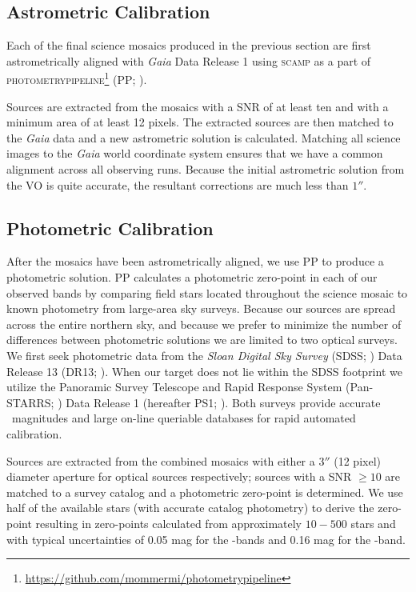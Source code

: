 \documentclass[apj, revtex4-1]{emulateapj}
\begin{document}

\subsection{Astrometric Calibration}
Each of the final science mosaics produced in the previous section are first astrometrically aligned with \textit{Gaia} \citep{GaiaCollaboration2016} Data Release 1 \citep{GaiaCollaboration2016a} using \textsc{scamp} \citep{Bertin2006} as a part of \textsc{photometrypipeline}\footnote{\url{https://github.com/mommermi/photometrypipeline}} (PP; \citealt{Mommert2017}).

Sources are extracted from the mosaics with a SNR of at least ten and with a minimum area of at least 12 pixels. The extracted sources are then matched to the \textit{Gaia} data and a new astrometric solution is calculated. Matching all science images to the \textit{Gaia} world coordinate system ensures that we have a common alignment across all observing runs. Because the initial astrometric solution from the VO is quite accurate, the resultant corrections are much less than $1''$.

\subsection{Photometric Calibration}
After the mosaics have been astrometrically aligned, we use PP to produce a photometric solution. PP calculates a photometric zero-point in each of our observed bands by comparing field stars located throughout the science mosaic to known photometry from large-area sky surveys. Because our sources are spread across the entire northern sky, and because we prefer to minimize the number of differences between photometric solutions we are limited to two optical surveys. We first seek photometric data from the \textit{Sloan Digital Sky Survey} (SDSS; \citealt{York2000}) Data Release 13 (DR13; \citealt{Albareti2017}). When our target does not lie within the SDSS footprint we utilize the Panoramic Survey Telescope and Rapid Response System (Pan-STARRS; \citealt{Chambers2016}) Data Release 1 (hereafter PS1; \citealt{Flewelling2016}). Both surveys provide accurate \sdssg\sdssr\sdssi\sdssz\ magnitudes and large on-line queriable databases for rapid automated calibration.

Sources are extracted from the combined mosaics with either a $3''$ (12 pixel) diameter aperture for optical sources respectively; sources with a SNR $\ge10$ are matched to a survey catalog and a photometric zero-point is determined. We use half of the available stars (with accurate catalog photometry) to derive the zero-point resulting in zero-points calculated from approximately $10-500$ stars and with typical uncertainties of 0.05 mag for the \sdssg\sdssr\sdssi-bands and 0.16 mag for the \sdssz-band.
\end{document}
